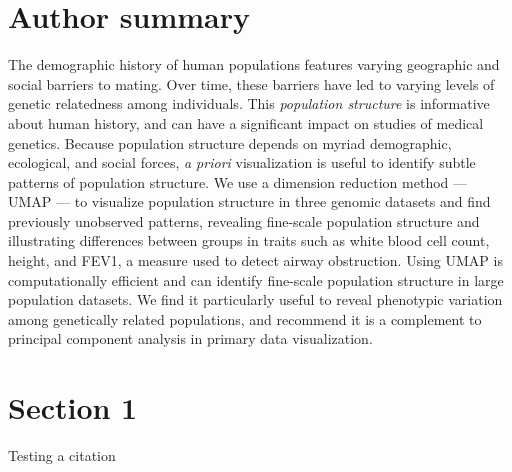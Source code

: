 \section{Author summary}

The demographic history of human populations features varying geographic and social barriers to mating. Over time, these barriers have led to varying levels of genetic relatedness among individuals.  This \emph{population structure} is informative about human history, and can have a significant impact on studies of medical genetics. Because population structure depends on myriad demographic, ecological, and social forces, \emph{a priori} visualization is useful to identify subtle patterns of population structure. We use a dimension reduction method --- UMAP --- to visualize population structure in three genomic datasets and find previously unobserved patterns, revealing fine-scale population structure and illustrating differences between groups in traits such as white blood cell count, height, and FEV1, a measure used to detect airway obstruction. Using UMAP is computationally efficient and can identify fine-scale population structure in large population datasets. We find it particularly useful to reveal phenotypic variation among genetically related populations, and recommend it is a complement  to principal component analysis in primary data visualization. 

\section{Section 1}

Testing a citation\citep{novembre2008europe}